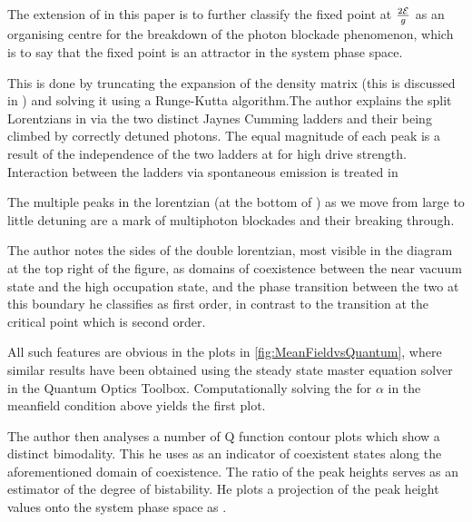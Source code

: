 The extension of \autocite{Alsing1999} in this paper is to further classify the fixed point at $\frac{2\mathcal{E}}{g}$ as an organising centre for the breakdown of the photon blockade phenomenon, which is to say that the fixed point is an attractor in the system phase space.

This is done by truncating the expansion of the density matrix (this is discussed in \autocite{Savage1988}) and solving it using a Runge-Kutta algorithm.The author explains the split Lorentzians in \autocite[Figure 1]{Carmichael2015} via the two distinct Jaynes Cumming ladders and their being climbed by correctly detuned photons. The equal magnitude of each peak is a result of the independence of the two ladders at for high drive strength. Interaction between the ladders via spontaneous emission is treated in \autocite[Section V]{Carmichael2015}

The multiple peaks in the lorentzian (at the bottom of \autocite[Figure 1]{Carmichael2015}) as we move from large to little detuning are a mark of multiphoton blockades and their breaking through.

The author notes the sides of the double lorentzian, most visible in the diagram at the top right of the figure, as domains of coexistence between the near vacuum state and the high occupation state, and the phase transition between the two at this boundary he classifies as first order, in contrast to the transition at the critical point which is second order.

All such features are obvious in the plots in \cref{fig:MeanFieldvsQuantum}, where similar results have been obtained using the steady state master equation solver in the Quantum Optics Toolbox\autocite{qotoolbox}. Computationally solving the for $\alpha$ in the meanfield condition above yields the first plot.

The author then analyses a number of Q function contour plots which show a distinct bimodality. This he uses as an indicator of coexistent states along the aforementioned domain of coexistence. The ratio of the peak heights serves as an estimator of the degree of bistability. He plots a projection of the peak height values onto the system phase space \autocite[Figure 1 right hand side]{Carmichael2015} as \autocite[Figure 2]{Carmichael2015}.

